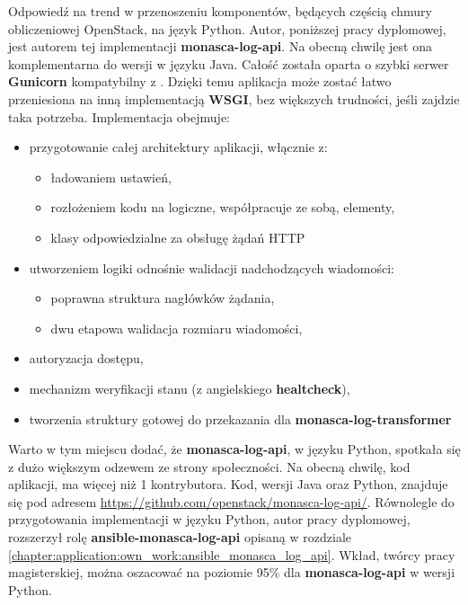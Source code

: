 Odpowiedź na trend w przenoszeniu komponentów, będących częścią chmury obliczeniowej OpenStack, na język Python. Autor, poniższej pracy dyplomowej, jest autorem tej implementacji \textbf{monasca-log-api}. Na obecną chwilę jest ona komplementarna do wersji w języku Java. Całość została oparta o szybki serwer \textbf{Gunicorn} kompatybilny z . Dzięki
temu aplikacja może zostać łatwo przeniesiona na inną implementacją \textbf{WSGI}, bez większych trudności,
jeśli zajdzie taka potrzeba. Implementacja obejmuje:
\begin{itemize}
    \item przygotowanie całej architektury aplikacji, włącznie z:
    \begin{itemize}
        \item ładowaniem ustawień,
        \item rozłożeniem kodu na logiczne, współpracuje ze sobą, elementy,
        \item klasy odpowiedzialne za obsługę żądań HTTP
    \end{itemize}
    \item utworzeniem logiki odnośnie walidacji nadchodzących wiadomości:
    \begin{itemize}
        \item poprawna struktura nagłówków żądania,
        \item dwu etapowa walidacja rozmiaru wiadomości,
    \end{itemize}
    \item autoryzacja dostępu,
    \item mechanizm weryfikacji stanu (z angielskiego \textbf{healtcheck}),
    \item tworzenia struktury gotowej do przekazania dla \textbf{monasca-log-transformer}
\end{itemize}

Warto w tym miejscu dodać, że \textbf{monasca-log-api}, w języku Python, spotkała się z dużo
większym odzewem ze strony społeczności. Na obecną chwilę, kod aplikacji, ma więcej niż 1 kontrybutora.
Kod, wersji Java oraz Python, znajduje się pod adresem \url{https://github.com/openstack/monasca-log-api/}.
Równolegle do przygotowania implementacji w języku Python, autor pracy dyplomowej, rozszerzył rolę
\textbf{ansible-monasca-log-api} opisaną w rozdziale \ref{chapter:application:own_work:ansible_monasca_log_api}.
Wkład, twórcy pracy magisterskiej, można oszacować na poziomie 95\% dla \textbf{monasca-log-api} w wersji
Python.

